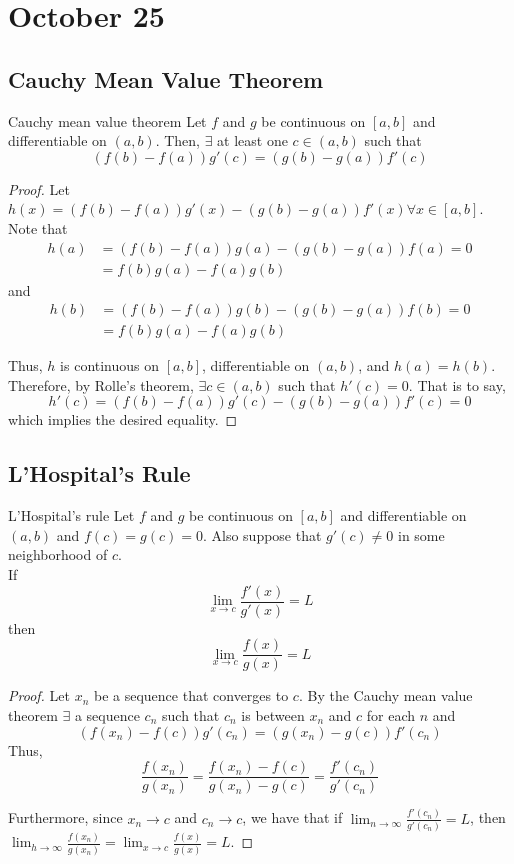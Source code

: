 \chapter{October 25}

\section{Cauchy Mean Value Theorem}
\begin{theorem}{Cauchy mean value theorem}{}
    Let $f$ and $g$ be continuous on $[a, b]$ and differentiable on $(a, b)$. Then, $\exists$ at least one $c \in (a, b)$ such that $$(f(b) - f(a)) g'(c) = (g(b) - g(a)) f'(c)$$
\end{theorem}
\begin{proof}
    Let $h(x) = (f(b) - f(a)) g'(x) - (g(b) - g(a)) f'(x) \forall x \in [a, b]$. \\
    Note that
    \begin{align*}
        h(a) &= (f(b) - f(a)) g(a) - (g(b) - g(a)) f(a) = 0 \\
        &= f(b)g(a) - f(a)g(b)
    \end{align*}
    and
    \begin{align*}
        h(b) &= (f(b) - f(a)) g(b) - (g(b) - g(a)) f(b) = 0 \\
        &= f(b)g(a) - f(a)g(b)
    \end{align*}

    Thus, $h$ is continuous on $[a, b]$, differentiable on $(a, b)$, and $h(a) = h(b)$. Therefore, by Rolle's theorem, $\exists c \in (a, b)$ such that $h'(c) = 0$. That is to say, $$h'(c) = (f(b) - f(a)) g'(c) - (g(b) - g(a)) f'(c) = 0$$ which implies the desired equality.
\end{proof}

\section{L'Hospital's Rule}
\begin{theorem}{L'Hospital's rule}{}
    Let $f$ and $g$ be continuous on $[a, b]$ and differentiable on $(a, b)$ and $f(c) = g(c) = 0$. Also suppose that $g'(c) \neq 0$ in some neighborhood of $c$. \\
    If $$\lim_{x \to c} \frac{f'(x)}{g'(x)} = L$$ then $$\lim_{x \to c} \frac{f(x)}{g(x)} = L$$
\end{theorem}
\begin{proof}
    Let $x_n$ be a sequence that converges to $c$. By the Cauchy mean value theorem $\exists$ a sequence $c_n$ such that $c_n$ is between $x_n$ and $c$ for each $n$ and $$(f(x_n) - f(c)) g'(c_n) = (g(x_n) - g(c)) f'(c_n)$$ Thus, $$\frac{f(x_n)}{g(x_n)} = \frac{f(x_n) - f(c)}{g(x_n) - g(c)} = \frac{f'(c_n)}{g'(c_n)}$$

    Furthermore, since $x_n \to c$ and $c_n \to c$, we have that if $\lim_{n \to \infty} \frac{f'(c_n)}{g'(c_n)} = L$, then $\lim_{h \to \infty} \frac{f(x_n)}{g(x_n)} = \lim_{x \to c} \frac{f(x)}{g(x)} = L$.
\end{proof}

